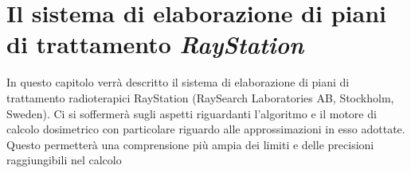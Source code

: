 \chapter{Il sistema di elaborazione di piani di trattamento \textit{RayStation}}
\setcounter{minitocdepth}{1}
\minitoc
\setcounter{minitocdepth}{2}
\textsf{In questo capitolo verrà descritto il sistema di elaborazione di piani di trattamento radioterapici RayStation (RaySearch Laboratories AB, Stockholm, Sweden). Ci si soffermerà sugli aspetti riguardanti l'algoritmo e il motore di calcolo dosimetrico con particolare riguardo alle approssimazioni in esso adottate. Questo permetterà una comprensione più ampia dei limiti e delle precisioni raggiungibili nel calcolo }

